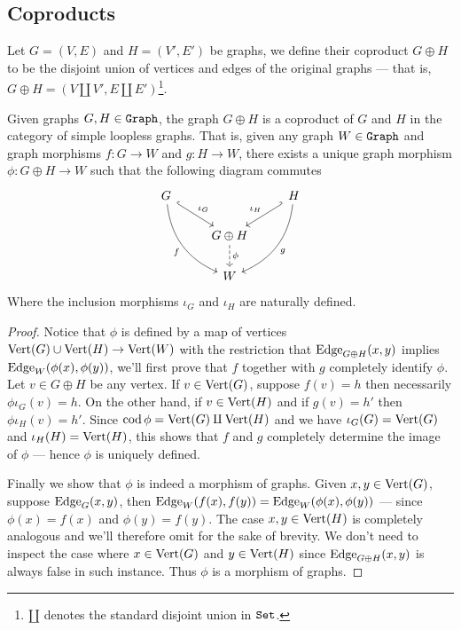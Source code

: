 \subsection{Coproducts}

\begin{definition}[Coproduct]\label{def: coprod-graph}
  Let \(G = (V, E)\) and \(H = (V', E')\) be graphs, we define their coproduct
  \(G \oplus H\) to be the disjoint union of vertices and edges of the original
  graphs --- that is, \(G \oplus H = (V \amalg V', E \amalg
  E')\)\footnote{\(\amalg\) denotes the standard disjoint union in \({\texttt{Set}}\).}.
\end{definition}

\begin{proposition}
  \label{prop: coprod-graph}
  Given graphs \(G, H \in {\texttt{Graph}}\), the graph \(G \oplus H\) is a coproduct of
  \(G\) and \(H\) in the category of simple loopless graphs. That is, given any
  graph \(W \in {\texttt{Graph}}\) and graph morphisms \(f: G \to W\) and \(g: H \to W\),
  there exists a unique graph morphism \(\phi: G \oplus H \to W\) such that the
  following diagram commutes
  \[
    \begin{tikzcd}
      G \ar[dr, hook, "\iota_G"] \ar[ddr, swap, bend right, "f"]
      & &H \ar[dl, swap, hook', "\iota_{H}"] \ar[ddl, bend left, "g"]
      \\
      &G \oplus H \ar[d, dashed, "\phi"]
      \\
      &W &
    \end{tikzcd}
  \]
  Where the inclusion morphisms \(\iota_G\) and \(\iota_{H}\) are naturally
  defined.
\end{proposition}

\begin{proof}
  Notice that \(\phi\) is defined by a map of vertices \(\operatorname{Vert}(G) \cup \operatorname{Vert}(H) \to
  \operatorname{Vert}(W)\) with the restriction that \(\operatorname{Edge}_{G \oplus H}(x, y)\) implies
  \(\operatorname{Edge}_W(\phi(x), \phi(y))\), we'll first prove that \(f\) together with \(g\)
  completely identify \(\phi\). Let \(v \in G \oplus H\) be any vertex. If \(v
  \in \operatorname{Vert}(G)\), suppose \(f(v) = h\) then necessarily \(\phi \iota_G(v) = h\). On
  the other hand, if \(v \in \operatorname{Vert}(H)\) and if \(g(v) = h'\) then \(\phi
  \iota_{H}(v) = h'\). Since \(\operatorname{cod} \phi = \operatorname{Vert}(G) \amalg \operatorname{Vert}(H)\) and we have
  \(\iota_G(G) = \operatorname{Vert}(G)\) and \(\iota_{H}(H) = \operatorname{Vert}(H)\), this shows that \(f\) and
  \(g\) completely determine the image of \(\phi\) --- hence \(\phi\) is
  uniquely defined.

  Finally we show that \(\phi\) is indeed a morphism of graphs. Given \(x, y \in
  \operatorname{Vert}(G)\), suppose \(\operatorname{Edge}_G(x, y)\), then \(\operatorname{Edge}_W(f(x), f(y)) = \operatorname{Edge}_W(\phi(x),
  \phi(y))\) --- since \(\phi(x) = f(x)\) and \(\phi(y) = f(y)\). The case \(x,
  y \in \operatorname{Vert}(H)\) is completely analogous and we'll therefore omit for the sake of
  brevity. We don't need to inspect the case where \(x \in \operatorname{Vert}(G)\) and \(y \in
  \operatorname{Vert}(H)\) since \(\operatorname{Edge}_{G \oplus H}(x, y)\) is always false in such instance. Thus
  \(\phi\) is a morphism of graphs.
\end{proof}

